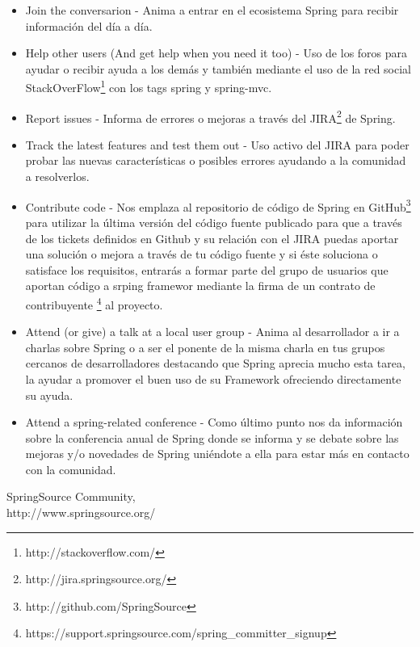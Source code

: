 \documentclass[11pt]{scrartcl}
\begin{document}
\begin{itemize}
    \item Join the conversarion - Anima a entrar en el ecosistema Spring para recibir informaci\'on del d\'ia a d\'ia.
    \item Help other users (And get help when you need it too) - Uso de los foros para ayudar o recibir ayuda a los dem\'as y tambi\'en mediante el uso de la red social StackOverFlow\footnote{http://stackoverflow.com/} con los tags spring y spring-mvc.
    \item Report issues - Informa de errores o mejoras a trav\'es del JIRA\footnote{http://jira.springsource.org/} de Spring.
    \item Track the latest features and test them out - Uso activo del JIRA para poder probar las nuevas caracter\'isticas o posibles errores ayudando a la comunidad a resolverlos.
    \item Contribute code - Nos emplaza al repositorio de c\'odigo de Spring en GitHub\footnote{http://github.com/SpringSource} para utilizar la última versi\'on del c\'odigo fuente publicado para que a trav\'es de los tickets definidos en Github y su relaci\'on con el JIRA puedas aportar una soluci\'on o mejora a trav\'es de tu c\'odigo fuente y si \'este soluciona o satisface los requisitos, entrar\'as a formar parte del grupo de usuarios que aportan c\'odigo a srping framewor mediante la firma de un contrato de contribuyente \footnote{https://support.springsource.com/spring\_committer\_signup} al proyecto.
    \item Attend (or give) a talk at a local user group - Anima al desarrollador a ir a charlas sobre Spring o a ser el ponente de la misma charla en tus grupos cercanos de desarrolladores destacando que Spring aprecia mucho esta tarea, la ayudar a promover el buen uso de su Framework ofreciendo directamente su ayuda.
    \item Attend a spring-related conference - Como último punto nos da informaci\'on sobre la conferencia anual de Spring donde se informa y se debate sobre las mejoras y/o novedades de Spring uni\'endote a ella para estar m\'as en contacto con la comunidad.
\end{itemize}

\begin{thebibliography}{9}

  SpringSource Community,\\
  http://www.springsource.org/

\end{thebibliography}
\end{document}
